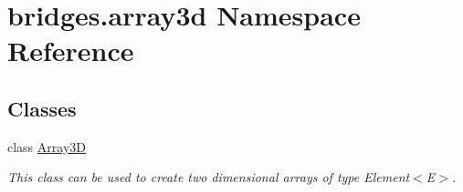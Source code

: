 \hypertarget{namespacebridges_1_1array3d}{}\section{bridges.\+array3d Namespace Reference}
\label{namespacebridges_1_1array3d}
\subsection*{Classes}
\begin{DoxyCompactItemize}
\item 
class \mbox{\hyperlink{classbridges_1_1array3d_1_1_array3_d}{Array3D}}
\begin{DoxyCompactList}\small\item\em This class can be used to create two dimensional arrays of type Element$<$\+E$>$. \end{DoxyCompactList}\end{DoxyCompactItemize}
